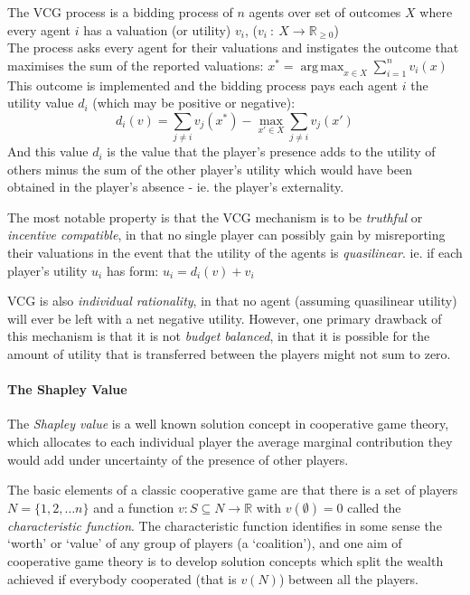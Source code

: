 \documentclass[
10pt, %
a4paper, %
oneside, %
headinclude,footinclude, %
BCOR5mm, %
]{scrartcl}
\DeclareMathOperator*{\argmax}{arg\,max}
\begin{document}
The VCG process is a bidding process of $n$ agents over set of outcomes $X$ where every agent $i$ has a valuation (or utility) $v_i$,
($ v_i~:~X\rightarrow \mathbb{R}_{\ge 0} $)\\
The process asks every agent for their valuations and instigates the outcome that maximises the sum of the reported valuations:
$ x^* = \argmax_{x\in X}\sum_{i=1}^{n}v_i(x) $\\
This outcome is implemented and the bidding process pays each agent $i$ the utility value $d_i$ (which may be positive or negative):
\begin{equation}\label{eq:VCG_payment_rule} d_i(v)=\sum_{j\ne i}v_j(x^*) - \max_{x'\in X}\sum_{j\ne i}v_j(x') \end{equation}
And this value $d_i$ is the value that the player's presence adds to the utility of others minus the sum of the other player's utility which would have been obtained in the player's absence - ie. the player's externality.


The most notable property is that the VCG mechanism is to be \textit{truthful} or \textit{incentive compatible}, in that no single player can possibly gain by misreporting their valuations in the event that the utility of the agents is \textit{quasilinear}.\cite{roberts1979characterization, Lavi2008} 
ie. if each player's utility $u_i$ has form:
$ u_i = d_i(v)+v_i $

VCG is also \textit{individual rationality}, in that no agent (assuming quasilinear utility) will ever be left with a net negative utility.
However, one primary drawback of this mechanism is that it is not \textit{budget balanced}, in that it is possible for the amount of utility that is transferred between the players might not sum to zero.


\paragraph{The Shapley Value}

The \textit{Shapley value} is a well known solution concept in cooperative game theory, which allocates to each individual player the average marginal contribution they would add under uncertainty of the presence of other players.

The basic elements of a classic cooperative game are that there is a set of players$N=\{1,2,\dots n\}$ and a function $v: S\subseteq N \rightarrow \mathbb{R}$ with $v(\emptyset)=0$ called the \textit{characteristic function}.
The characteristic function identifies in some sense the `worth' or `value' of any group of players (a `coalition'), and one aim of cooperative game theory is to develop solution concepts which split the wealth achieved if everybody cooperated (that is $v(N)$) between all the players.
\end{document}
